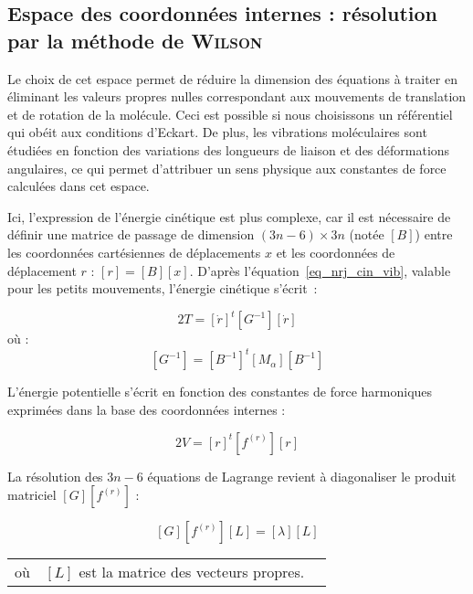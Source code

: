 \subsection{Espace des coordonnées internes : résolution par la méthode de \textsc{Wilson}}

Le choix de cet espace permet de réduire la dimension des équations à traiter en éliminant les valeurs propres nulles correspondant aux mouvements de translation et de rotation de la molécule. Ceci est possible si nous choisissons un référentiel qui obéit aux conditions d'Eckart. De plus, les vibrations moléculaires sont étudiées en fonction des variations des longueurs de liaison et des déformations angulaires, ce qui permet d'attribuer un sens physique aux constantes de force calculées dans cet espace.

Ici, l'expression de l'énergie cinétique est plus complexe, car il est nécessaire de définir une matrice de passage de dimension $(3n-6)\times3n$ (notée $\left[B\right]$) entre les coordonnées cartésiennes de déplacements $x$ et les coordonnées de déplacement $r$ : $\left[r\right] = \left[B\right]\left[x\right]$. D'après l'équation~\ref{eq_nrj_cin_vib},  valable pour les petits mouvements, l'énergie cinétique s'écrit~:

\begin{equation}
2T = \left[\dot{r}\right]^t\left[G^{-1}\right]\left[\dot{r}\right] 
\end{equation}
\noindent où :
\begin{equation}
\left[G^{-1}\right] = \left[B^{-1}\right]^t \left[M_{\alpha}\right]\left[B^{-1}\right]
\end{equation}

L'énergie potentielle s'écrit en fonction des constantes de force harmoniques exprimées dans la base des coordonnées internes :

\begin{equation}
2V = \left[r\right]^t \left[f^{(r)}\right] \left[r\right]
\end{equation}

La résolution des $3n-6$ équations de Lagrange revient à diagonaliser le produit matriciel $\left[G\right]\left[f^{(r)}\right]$ :

\begin{equation}
\left[G\right]\left[f^{(r)}\right]\left[L\right] = \left[\lambda\right]\left[L\right]
\end{equation}
\begin{flushleft}
	\begin{tabular}{@{}lrp{10cm}}
		où & $\left[L\right]$ est la matrice des vecteurs propres. 
	\end{tabular}
\end{flushleft}


